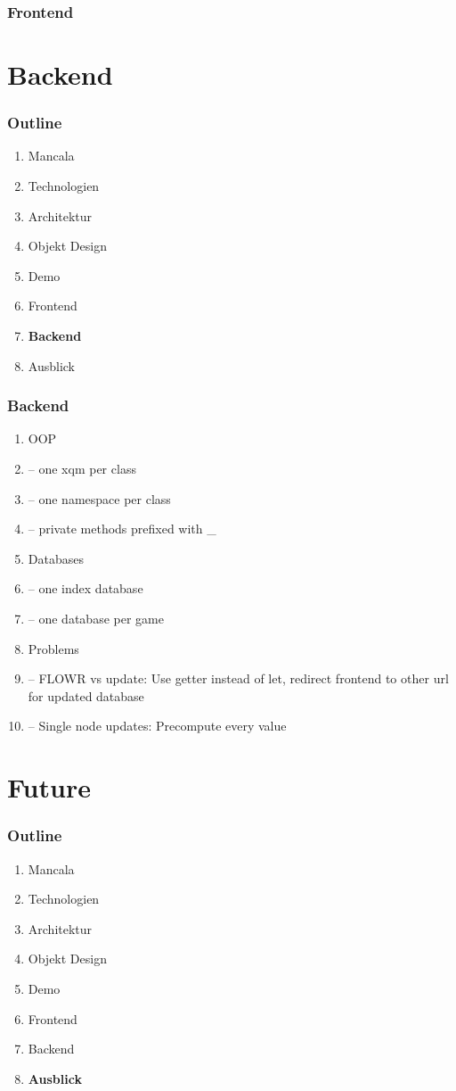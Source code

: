 \documentclass[
	10pt,
	t		%
]{beamer}
\begin{document}
\begin{frame}
\frametitle{Frontend}

\end{frame}

\section{Backend}
\begin{frame}
\frametitle{Outline}
\begin{enumerate}
\item Mancala
\item Technologien
\item Architektur
\item Objekt Design
\item Demo
\item Frontend
\item \textbf{Backend}
\item Ausblick
\end{enumerate}
\end{frame}

\begin{frame}
\frametitle{Backend}
\begin{enumerate}
\item OOP
\item -- one xqm per class
\item -- one namespace per class
\item -- private methods prefixed with _

\item Databases
\item -- one index database
\item -- one database per game

\item Problems
\item -- FLOWR vs update: Use getter instead of let, redirect frontend to other url for updated database
\item -- Single node updates: Precompute every value
\end{enumerate}

\end{frame}

\section{Future}
\begin{frame}
\frametitle{Outline}
\begin{enumerate}
\item Mancala
\item Technologien
\item Architektur
\item Objekt Design
\item Demo
\item Frontend
\item Backend
\item \textbf{Ausblick}
\end{enumerate}
\end{frame}
\end{document}
